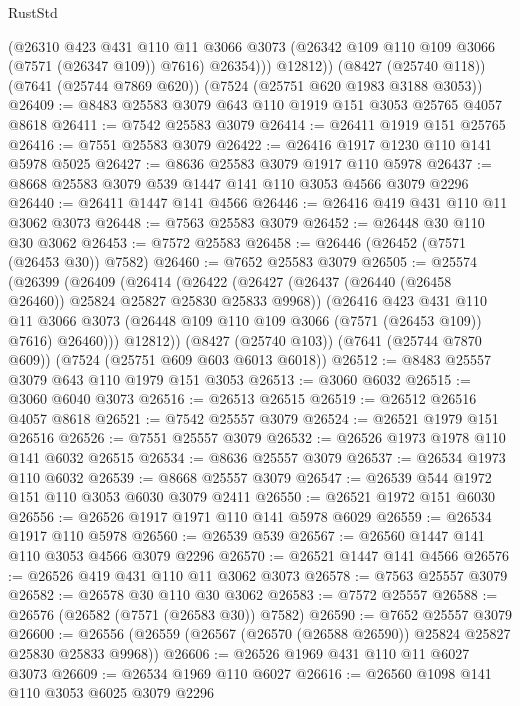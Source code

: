 \begin{lexlean}{RustStd}
\begin{coremodule}
{\begin{coremodule}
{{{{{{{{{{{{{{{{{{{{{{{{{{{{{{{{            (@26310
              @423
              @431
              @110
              @11
              @3066
              @3073
              (@26342 @109 @110 @109 @3066 (@7571 (@26347 @109)) @7616)
              @26354)))
        @12812))
    (@8427 (@25740 @118))
    (@7641 (@25744 @7869 @620))
    (@7524 (@25751 @620 @1983 @3188 @3053))
@26409 := @8483 @25583 @3079 @643 @110 @1919 @151 @3053 @25765 @4057 @8618
@26411 := @7542 @25583 @3079
@26414 := @26411 @1919 @151 @25765
@26416 := @7551 @25583 @3079
@26422 := @26416 @1917 @1230 @110 @141 @5978 @5025
@26427 := @8636 @25583 @3079 @1917 @110 @5978
@26437 := @8668 @25583 @3079 @539 @1447 @141 @110 @3053 @4566 @3079 @2296
@26440 := @26411 @1447 @141 @4566
@26446 := @26416 @419 @431 @110 @11 @3062 @3073
@26448 := @7563 @25583 @3079
@26452 := @26448 @30 @110 @30 @3062
@26453 := @7572 @25583
@26458 := @26446 (@26452 (@7571 (@26453 @30)) @7582)
@26460 := @7652 @25583 @3079
@26505 := @25574
    (@26399
      (@26409
        (@26414
          (@26422
            (@26427 (@26437 (@26440 (@26458 @26460)) @25824 @25827 @25830 @25833 @9968))
            (@26416
              @423
              @431
              @110
              @11
              @3066
              @3073
              (@26448 @109 @110 @109 @3066 (@7571 (@26453 @109)) @7616)
              @26460)))
        @12812))
    (@8427 (@25740 @103))
    (@7641 (@25744 @7870 @609))
    (@7524 (@25751 @609 @603 @6013 @6018))
@26512 := @8483 @25557 @3079 @643 @110 @1979 @151 @3053
@26513 := @3060 @6032
@26515 := @3060 @6040 @3073
@26516 := @26513 @26515
@26519 := @26512 @26516 @4057 @8618
@26521 := @7542 @25557 @3079
@26524 := @26521 @1979 @151 @26516
@26526 := @7551 @25557 @3079
@26532 := @26526 @1973 @1978 @110 @141 @6032 @26515
@26534 := @8636 @25557 @3079
@26537 := @26534 @1973 @110 @6032
@26539 := @8668 @25557 @3079
@26547 := @26539 @544 @1972 @151 @110 @3053 @6030 @3079 @2411
@26550 := @26521 @1972 @151 @6030
@26556 := @26526 @1917 @1971 @110 @141 @5978 @6029
@26559 := @26534 @1917 @110 @5978
@26560 := @26539 @539
@26567 := @26560 @1447 @141 @110 @3053 @4566 @3079 @2296
@26570 := @26521 @1447 @141 @4566
@26576 := @26526 @419 @431 @110 @11 @3062 @3073
@26578 := @7563 @25557 @3079
@26582 := @26578 @30 @110 @30 @3062
@26583 := @7572 @25557
@26588 := @26576 (@26582 (@7571 (@26583 @30)) @7582)
@26590 := @7652 @25557 @3079
@26600 := @26556 (@26559 (@26567 (@26570 (@26588 @26590)) @25824 @25827 @25830 @25833 @9968))
@26606 := @26526 @1969 @431 @110 @11 @6027 @3073
@26609 := @26534 @1969 @110 @6027
@26616 := @26560 @1098 @141 @110 @3053 @6025 @3079 @2296
}}}}}}}}}}}}}}}}}}}}}}}}}}}}}}}}
\end{coremodule}}
\end{coremodule}
\end{lexlean}
